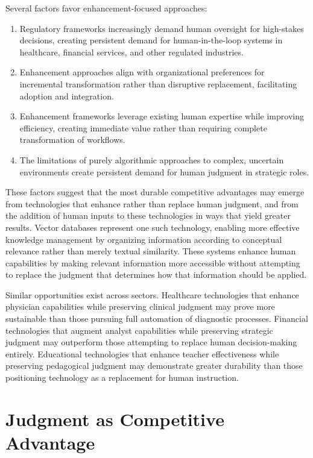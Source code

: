 \documentclass[
  Letterpaper,
]{scrbook}
\begin{document}
Several factors favor enhancement-focused approaches:

\begin{enumerate}
\def\labelenumi{\arabic{enumi}.}
\item
  Regulatory frameworks increasingly demand human oversight for
  high-stakes decisions, creating persistent demand for
  human-in-the-loop systems in healthcare, financial services, and other
  regulated industries.
\item
  Enhancement approaches align with organizational preferences for
  incremental transformation rather than disruptive replacement,
  facilitating adoption and integration.
\item
  Enhancement frameworks leverage existing human expertise while
  improving efficiency, creating immediate value rather than requiring
  complete transformation of workflows.
\item
  The limitations of purely algorithmic approaches to complex, uncertain
  environments create persistent demand for human judgment in strategic
  roles.
\end{enumerate}

These factors suggest that the most durable competitive advantages may
emerge from technologies that enhance rather than replace human
judgment, and from the addition of human inputs to these technologies in
ways that yield greater results. Vector databases represent one such
technology, enabling more effective knowledge management by organizing
information according to conceptual relevance rather than merely textual
similarity. These systems enhance human capabilities by making relevant
information more accessible without attempting to replace the judgment
that determines how that information should be applied.

Similar opportunities exist across sectors. Healthcare technologies that
enhance physician capabilities while preserving clinical judgment may
prove more sustainable than those pursuing full automation of diagnostic
processes. Financial technologies that augment analyst capabilities
while preserving strategic judgment may outperform those attempting to
replace human decision-making entirely. Educational technologies that
enhance teacher effectiveness while preserving pedagogical judgment may
demonstrate greater durability than those positioning technology as a
replacement for human instruction.

\section{Judgment as Competitive
Advantage}\label{judgment-as-competitive-advantage}
\end{document}
